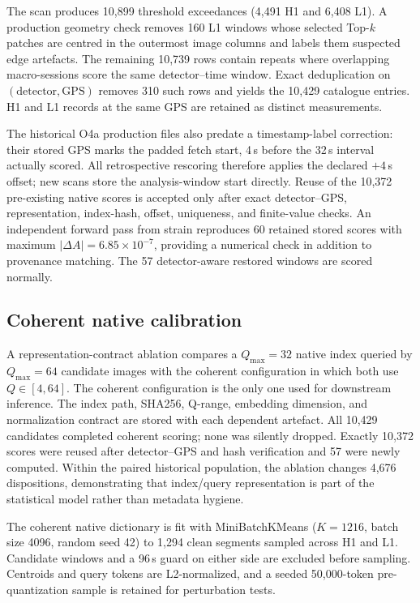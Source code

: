 \documentclass[12pt]{article}
\begin{document}
The scan produces 10,899 threshold exceedances (4,491 H1 and 6,408 L1).
A production geometry check removes 160 L1 windows whose selected Top-$k$
patches are centred in the outermost image columns and labels them suspected
edge artefacts.  The remaining 10,739 rows contain repeats where overlapping
macro-sessions score the same detector--time window.  Exact deduplication on
$(\mathrm{detector},\mathrm{GPS})$ removes 310 such rows and yields the 10,429
catalogue entries.  H1 and L1 records at the same GPS are retained as distinct
measurements.

The historical O4a production files also predate a timestamp-label correction:
their stored GPS marks the padded fetch start, 4\,s before the 32\,s interval
actually scored.  All retrospective rescoring therefore applies the declared
$+4$\,s offset; new scans store the analysis-window start directly.  Reuse of
the 10,372 pre-existing native scores is accepted only after exact
detector--GPS, representation, index-hash, offset, uniqueness, and finite-value
checks.  An independent forward pass from strain reproduces 60 retained stored
scores with maximum $|\Delta A|=6.85\times10^{-7}$, providing a numerical
check in addition to provenance matching.  The 57 detector-aware restored
windows are scored normally.

\subsection{Coherent native calibration}

A representation-contract ablation compares a $Q_{\max}=32$ native index
queried by $Q_{\max}=64$ candidate images with the coherent configuration in
which both use $Q\in[4,64]$.  The coherent configuration is the only one used
for downstream inference.  The index path, SHA256, Q-range, embedding
dimension, and normalization contract are stored with each dependent
artefact. All 10,429 candidates completed coherent scoring; none was silently
dropped. Exactly 10,372 scores were reused after detector--GPS and hash
verification and 57 were newly computed. Within the paired historical
population, the ablation changes 4,676 dispositions, demonstrating that
index/query representation is part of the statistical model rather than
metadata hygiene.

The coherent native dictionary is fit with MiniBatchKMeans \cite{sculley2010}
($K=1216$, batch size 4096, random seed 42) to 1,294 clean segments sampled
across H1 and L1.  Candidate windows and a 96\,s guard on either side are
excluded before sampling.  Centroids and query tokens are L2-normalized, and a
seeded 50,000-token pre-quantization sample is retained for perturbation tests.
\end{document}
